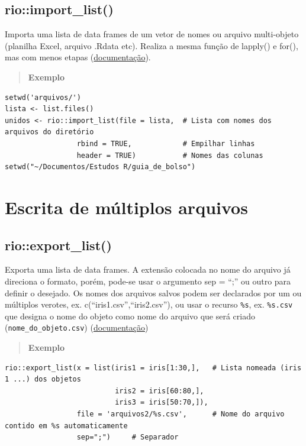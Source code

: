 \documentclass[
]{book}
\theoremstyle{definition}
\theoremstyle{definition}
\theoremstyle{definition}
\theoremstyle{definition}
\theoremstyle{remark}
\begin{document}
\hypertarget{rioimport_list}{%
\subsection{rio::import\_list()}\label{rioimport_list}}

Importa uma lista de data frames de um vetor de nomes ou arquivo multi-objeto (planilha Excel, arquivo .Rdata etc). Realiza a mesma função de lapply() e for(), mas com menos etapas (\href{https://www.rdocumentation.org/packages/rio/versions/0.5.29/topics/import_list}{documentação}).

\begin{quote}
\textbf{Exemplo}
\end{quote}

\begin{verbatim}
setwd('arquivos/')
lista <- list.files()
unidos <- rio::import_list(file = lista,  # Lista com nomes dos arquivos do diretório
                 rbind = TRUE,            # Empilhar linhas 
                 header = TRUE)           # Nomes das colunas
setwd("~/Documentos/Estudos R/guia_de_bolso")
\end{verbatim}

\hypertarget{escrita-de-muxfaltiplos-arquivos}{%
\section{Escrita de múltiplos arquivos}\label{escrita-de-muxfaltiplos-arquivos}}

\hypertarget{rioexport_list}{%
\subsection{rio::export\_list()}\label{rioexport_list}}

Exporta uma lista de data frames. A extensão colocada no nome do arquivo já direciona o formato, porém, pode-se usar o argumento sep = ``;'' ou outro para definir o desejado. Os nomes dos arquivos salvos podem ser declarados por um ou múltiplos verotes, ex. c(``iris1.csv'',``iris2.csv''), ou usar o recurso \texttt{\%s}, ex. \texttt{\%s.csv} que designa o nome do objeto como nome do arquivo que será criado (\texttt{nome\_do\_objeto.csv}) (\href{https://www.rdocumentation.org/packages/rio/versions/0.5.26/topics/export_list}{documentação})

\begin{quote}
\textbf{Exemplo}
\end{quote}

\begin{verbatim}
rio::export_list(x = list(iris1 = iris[1:30,],   # Lista nomeada (iris 1 ...) dos objetos
                          iris2 = iris[60:80,],
                          iris3 = iris[50:70,]),
                 file = 'arquivos2/%s.csv',      # Nome do arquivo contido em %s automaticamente
                 sep=";")     # Separador
\end{verbatim}
\end{document}
